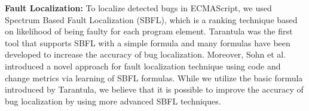 \textbf{Fault Localization:} To localize detected bugs in ECMAScript, we used
Spectrum Based Fault Localization (SBFL)\cite{sbfl-survey}, which is a ranking
technique based on likelihood of being faulty for each program element.
Tarantula\cite{tarantula, tarantula2} was the first tool that supports SBFL
with a simple formula and many formulas have been developed\cite{ample, zoltar,
sbfl-model, effect-sbfl} to increase the accuracy of bug localization.
Moreover, Sohn et al.\cite{fluccs} introduced a novel approach for fault
localization technique using code and change metrics via learning of SBFL
formulas.  While we utilize the basic formula introduced by Tarantula, we
believe that it is possible to improve the accuracy of bug localization by
using more advanced SBFL techniques.


